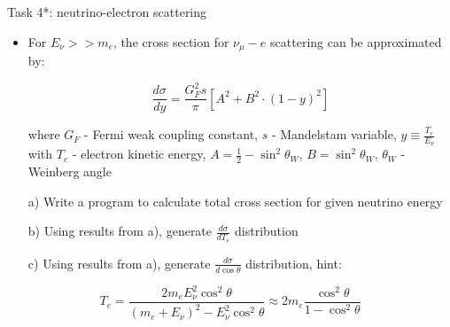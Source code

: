 \begin{slide}[toc = Task 4*]{Task 4*: neutrino-electron scattering}
\null\vfill

  \begin{itemize}
   \item For $E_\nu >> m_e$, the cross section for $\nu_\mu-e$ scattering can be approximated by:
   
   $$\frac{d\sigma}{dy} = \frac{G_F^2 s}{\pi}\left[A^2 + B^2\cdot(1 - y)^2\right]$$
   
   where $G_F$ - Fermi weak coupling constant, $s$ - Mandelstam variable, $y \equiv \frac{T_e}{E_\nu}$ with $T_e$ - electron kinetic energy, $A = \frac{1}{2} - \sin^2\theta_W$, $B = \sin^2\theta_W$, $\theta_W$ - Weinberg angle
   
   \item[a)] Write a program to calculate total cross section for given neutrino energy
   \item[b)] Using results from a), generate $\frac{d\sigma}{dT_e}$ distribution
   \item[c)] Using results from a), generate $\frac{d\sigma}{d\cos\theta}$ distribution, hint:  
  \end{itemize}

   $$T_e = \frac{2m_eE_\nu^2\cos^2\theta}{(m_e + E_\nu)^2 - E_\nu^2\cos^2\theta} \approx 2m_e \frac{\cos^2\theta}{1 - \cos^2\theta}$$

\vfill\null
\end{slide}